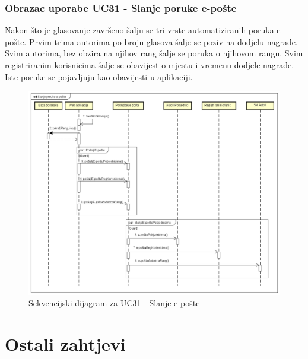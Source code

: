 				\newpage
				
				\subsubsection{Obrazac uporabe UC31 - Slanje poruke e-pošte}
				Nakon što je glasovanje završeno šalju se tri vrste automatiziranih poruka e-pošte. Prvim trima autorima po broju glasova šalje se poziv na dodjelu nagrade. Svim autorima, bez obzira na njihov rang šalje se poruka o njihovom rangu. Svim registriranim korisnicima šalje se obavijest o mjestu i vremenu dodjele nagrade. Iste poruke se pojavljuju kao obavijesti u aplikaciji.
				
				\begin{figure}[hp!]
					\includegraphics[width=\linewidth]{Slike/SD_SlanjeEPoste.png}
					\caption{Sekvencijski dijagram za UC31 - Slanje e-pošte}
				\end{figure}
				
				\newpage
				
				\eject
			
		\section{Ostali zahtjevi}
		
